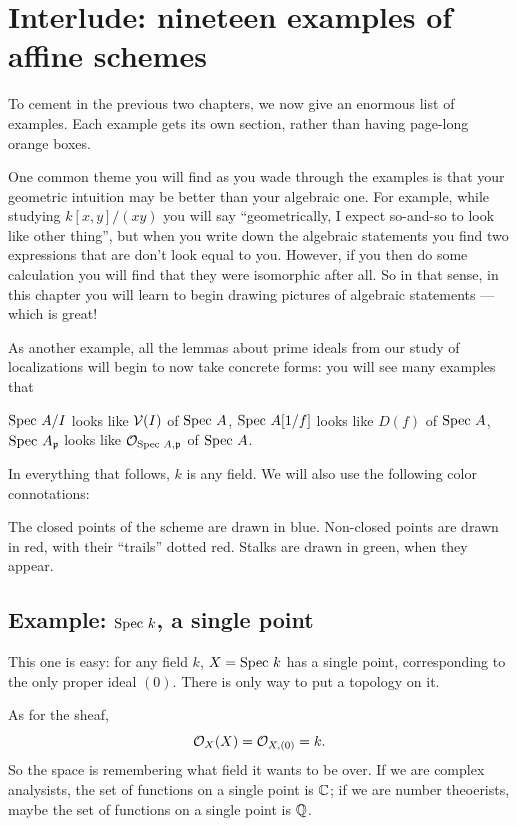 \chapter{Interlude: nineteen examples of affine schemes}
\label{ch:spec_examples}
To cement in the previous two chapters,
we now give an enormous list of examples.
Each example gets its own section,
rather than having page-long orange boxes.

One common theme you will find as you wade through
the examples is that your geometric intuition may
be better than your algebraic one.
For example, while studying $k[x,y] / (xy)$ you will say
``geometrically, I expect so-and-so to look like other thing'',
but when you write down the algebraic statements
you find two expressions that are don't look equal to you.
However, if you then do some calculation you will
find that they were isomorphic after all.
So in that sense, in this chapter you will learn to begin drawing
pictures of algebraic statements --- which is great!

As another example, all the lemmas about
prime ideals from our study of localizations
will begin to now take concrete forms:
you will see many examples that
\begin{itemize}
	\ii $\text{Spec } A/I$ looks like $\mathcal V(I)$ of $\text{Spec } A$,
	\ii $\text{Spec } A[1/f]$ looks like $D(f)$ of $\text{Spec } A$,
	\ii $\text{Spec } A_\mathfrak p$ looks like $\mathcal O_{\text{Spec } A, \mathfrak p}$ of $\text{Spec } A$.
\end{itemize}

In everything that follows, $k$ is any field.
We will also use the following color connotations:
\begin{itemize}
	\ii The closed points of the scheme are drawn in blue.
	\ii Non-closed points are drawn in red,
	with their ``trails'' dotted red.
	\ii Stalks are drawn in green, when they appear.
\end{itemize}


\section{Example: $\text{Spec } k$, a single point}
This one is easy: for any field $k$,
$X = \text{Spec } k$ has a single point,
corresponding to the only proper ideal $(0)$.
There is only way to put a topology on it.

As for the sheaf,
\[ \mathcal O_X(X) = \mathcal O_{X,(0)} = k. \]
So the space is remembering what field it wants to be over.
If we are complex analysists,
the set of functions on a single point is $\mathbb C$;
if we are number theoerists,
maybe the set of functions on a single point is $\mathbb Q$.

